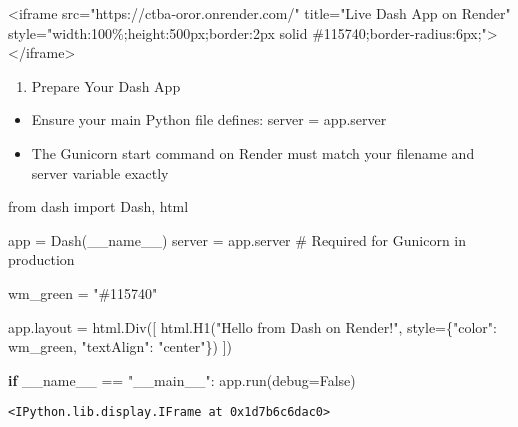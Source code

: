 \documentclass[
  letterpaper,
  DIV=11,
  numbers=noendperiod]{scrreprt}
\newenvironment{Shaded}{\begin{snugshade}}{\end{snugshade}}
\newcommand{\CommentTok}[1]{\textcolor[rgb]{0.37,0.37,0.37}{#1}}
\newcommand{\ControlFlowTok}[1]{\textcolor[rgb]{0.00,0.23,0.31}{\textbf{#1}}}
\newcommand{\ImportTok}[1]{\textcolor[rgb]{0.00,0.46,0.62}{#1}}
\newcommand{\NormalTok}[1]{\textcolor[rgb]{0.00,0.23,0.31}{#1}}
\newcommand{\OperatorTok}[1]{\textcolor[rgb]{0.37,0.37,0.37}{#1}}
\newcommand{\StringTok}[1]{\textcolor[rgb]{0.13,0.47,0.30}{#1}}
\newcommand{\VariableTok}[1]{\textcolor[rgb]{0.07,0.07,0.07}{#1}}
\providecommand{\tightlist}{%
  \setlength{\itemsep}{0pt}\setlength{\parskip}{0pt}}\usepackage{longtable,booktabs,array}
\begin{document}
\begin{Shaded}
\begin{Highlighting}[]
\NormalTok{\textless{}iframe src="https://ctba{-}oror.onrender.com/" title="Live Dash App on Render" style="width:100\%;height:500px;border:2px solid \#115740;border{-}radius:6px;"\textgreater{}\textless{}/iframe\textgreater{}}
\end{Highlighting}
\end{Shaded}

\begin{enumerate}
\def\labelenumi{\arabic{enumi})}
\tightlist
\item
  Prepare Your Dash App
\end{enumerate}

\begin{itemize}
\item
  Ensure your main Python file defines: server = app.server
\item
  The Gunicorn start command on Render must match your filename and
  server variable exactly
\end{itemize}

\begin{Shaded}
\begin{Highlighting}[]
\ImportTok{from}\NormalTok{ dash }\ImportTok{import}\NormalTok{ Dash, html}

\NormalTok{app }\OperatorTok{=}\NormalTok{ Dash(}\VariableTok{\_\_name\_\_}\NormalTok{)}
\NormalTok{server }\OperatorTok{=}\NormalTok{ app.server  }\CommentTok{\# Required for Gunicorn in production}

\NormalTok{wm\_green }\OperatorTok{=} \StringTok{"\#115740"}

\NormalTok{app.layout }\OperatorTok{=}\NormalTok{ html.Div([}
\NormalTok{    html.H1(}\StringTok{"Hello from Dash on Render!"}\NormalTok{, style}\OperatorTok{=}\NormalTok{\{}\StringTok{"color"}\NormalTok{: wm\_green, }\StringTok{"textAlign"}\NormalTok{: }\StringTok{"center"}\NormalTok{\})}
\NormalTok{])}

\ControlFlowTok{if} \VariableTok{\_\_name\_\_} \OperatorTok{==} \StringTok{"\_\_main\_\_"}\NormalTok{:}
\NormalTok{    app.run(debug}\OperatorTok{=}\VariableTok{False}\NormalTok{)}
\end{Highlighting}
\end{Shaded}

\begin{verbatim}
<IPython.lib.display.IFrame at 0x1d7b6c6dac0>
\end{verbatim}
\end{document}
